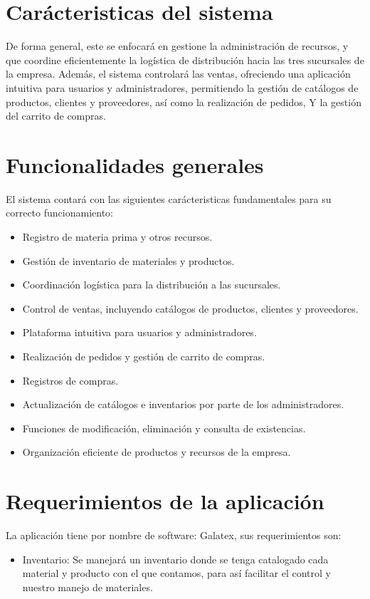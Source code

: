 \documentclass[12pt,a4paper]{article}
\begin{document}
\begin{multicols}{2}
		\section{Carácteristicas del sistema}
		De forma general, este se enfocará en gestione la administración de recursos, y que coordine eficientemente la logística de distribución hacia las tres sucursales de la empresa. Además, el sistema controlará las ventas, ofreciendo una aplicación intuitiva para usuarios y administradores, permitiendo la gestión de catálogos de productos, clientes y proveedores, así como la realización de pedidos, Y la gestión del carrito de compras.
		
		\section{Funcionalidades generales}
		El sistema contará con las siguientes carácteristicas fundamentales para su correcto funcionamiento:
		
		\begin{itemize}
			\item     Registro de materia prima y otros recursos.
			\item Gestión de inventario de materiales y productos.
			\item Coordinación logística para la distribución a las sucursales.
			\item Control de ventas, incluyendo catálogos de productos, clientes y proveedores.
			\item Plataforma intuitiva para usuarios y administradores.
			\item Realización de pedidos y gestión de carrito de compras.
			\item Registros de compras.
			\item Actualización de catálogos e inventarios por parte de los administradores.
			\item Funciones de modificación, eliminación y consulta de existencias.
			\item Organización eficiente de productos y recursos de la empresa.
		\end{itemize}
		
		\section{Requerimientos de la aplicación}
		La aplicación tiene por nombre de software: Galatex, sus requerimientos son:
		
		\begin{itemize}
			\item Inventario: 
			\subitem  Se manejará un inventario donde se
			tenga catalogado cada material y
			producto con el que contamos, para así
			facilitar el control y nuestro manejo de
			materiales.
			

\end{itemize}
\end{multicols}
\end{document}
